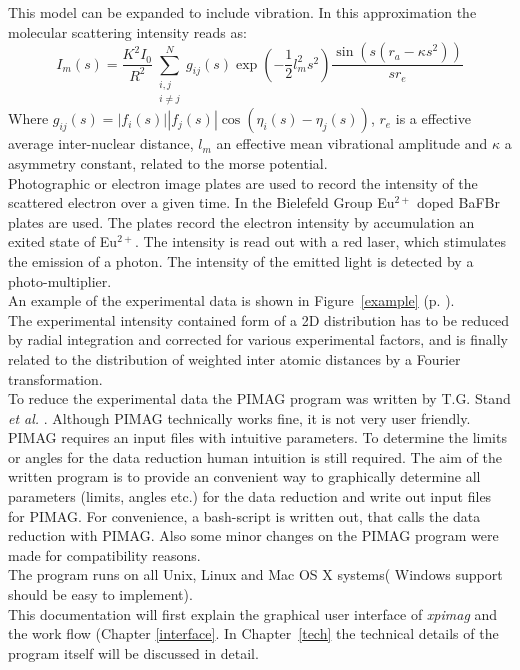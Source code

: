 This model can be expanded to include vibration. In this approximation the molecular scattering intensity reads as: 
\begin{equation*}
I_m(s) = \frac{K^2I_0}{R^2} \sum^N_{ \substack{i,j \\ i\neq j}}g_{ij}(s) \exp \left( -\frac{1}{2} l_m^2s^2 \right) \frac{\sin( s(r_a - \kappa s^2))}{sr_e}
\end{equation*}
 Where $g_{ij}(s) = |f_i(s)||f_j(s)|\cos(\eta_i(s) - \eta_j(s))$, $r_e$ is a effective average inter-nuclear distance, $l_m$ an effective mean vibrational amplitude and $\kappa$ a asymmetry constant, related to the morse potential. \\
 Photographic or electron image plates are used to record the intensity of the scattered electron over a given time. In the Bielefeld Group Eu$^{2+}$ doped BaFBr plates are used. The plates record the electron intensity by accumulation an exited state of Eu$^{2+}$. The intensity is read out with a red laser, which stimulates the emission of a photon. The intensity of the emitted light is detected by a photo-multiplier.  \\
An example of the experimental data is shown in Figure~\ref{example} (p. \pageref{example}).\\
The experimental intensity contained form of a 2D distribution has to be reduced by radial integration and corrected for various experimental factors, and is finally related to the distribution of weighted inter atomic distances by a Fourier transformation. \cite{gedbook}\\
To reduce the experimental data the PIMAG program was written by  T.G. Stand \textit{et al.} \cite{pimag}. Although PIMAG technically works fine, it is not very user friendly. PIMAG requires an input files with intuitive parameters.  To determine the limits or angles for the data reduction human intuition is still required. The aim of the written program is to provide an convenient way to graphically determine all parameters (limits, angles etc.) for the data reduction and write out input files for PIMAG. For convenience, a bash-script is written out, that calls the data reduction with PIMAG. Also some minor changes on the PIMAG program were made for compatibility reasons. \\
The program runs on all Unix, Linux and Mac OS X systems( Windows support should be easy to implement). \\
This documentation will first explain the graphical user interface of \textit{xpimag} and the work flow (Chapter \ref{interface}. In Chapter~\ref{tech} the technical details of the program itself will be discussed in detail. 
 
